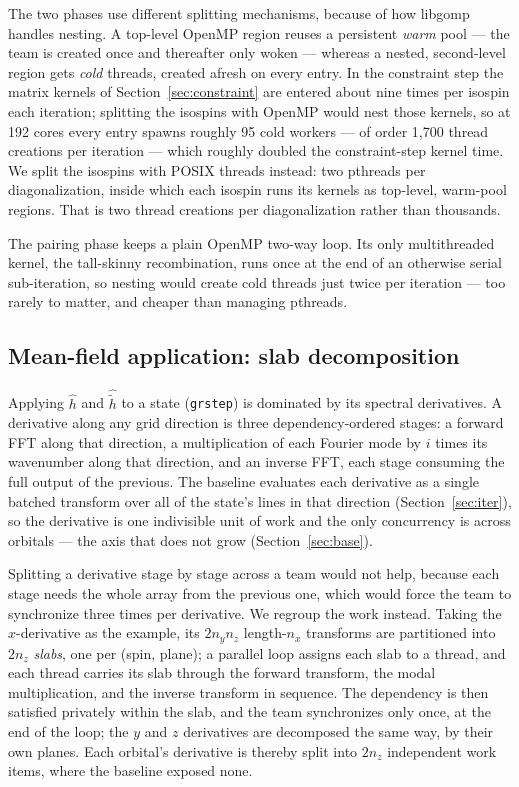 \documentclass[preprint,12pt]{elsarticle}
\numberwithin{equation}{section}
\begin{document}
The two phases use different splitting mechanisms, because of how libgomp handles nesting. A top-level OpenMP region reuses a persistent \emph{warm} pool --- the team is created once and thereafter only woken --- whereas a nested, second-level region gets \emph{cold} threads, created afresh on every entry. In the constraint step the matrix kernels of Section~\ref{sec:constraint} are entered about nine times per isospin each iteration; splitting the isospins with OpenMP would nest those kernels, so at 192 cores every entry spawns roughly 95 cold workers --- of order 1{,}700 thread creations per iteration --- which roughly doubled the constraint-step kernel time. We split the isospins with POSIX threads instead: two pthreads per diagonalization, inside which each isospin runs its kernels as top-level, warm-pool regions. That is two thread creations per diagonalization rather than thousands.

The pairing phase keeps a plain OpenMP two-way loop. Its only multithreaded kernel, the tall-skinny recombination, runs once at the end of an otherwise serial sub-iteration, so nesting would create cold threads just twice per iteration --- too rarely to matter, and cheaper than managing pthreads.

\subsection{Mean-field application: slab decomposition}\label{sec:mf}
Applying $\hat h$ and $\hat{\tilde h}$ to a state (\texttt{grstep}) is dominated by its spectral derivatives. A derivative along any grid direction is three dependency-ordered stages: a forward FFT along that direction, a multiplication of each Fourier mode by $i$ times its wavenumber along that direction, and an inverse FFT, each stage consuming the full output of the previous. The baseline evaluates each derivative as a single batched transform over all of the state's lines in that direction (Section~\ref{sec:iter}), so the derivative is one indivisible unit of work and the only concurrency is across orbitals --- the axis that does not grow (Section~\ref{sec:base}).

Splitting a derivative stage by stage across a team would not help, because each stage needs the whole array from the previous one, which would force the team to synchronize three times per derivative. We regroup the work instead. Taking the $x$-derivative as the example, its $2n_yn_z$ length-$n_x$ transforms are partitioned into $2n_z$ \emph{slabs}, one per (spin, plane); a parallel loop assigns each slab to a thread, and each thread carries its slab through the forward transform, the modal multiplication, and the inverse transform in sequence. The dependency is then satisfied privately within the slab, and the team synchronizes only once, at the end of the loop; the $y$ and $z$ derivatives are decomposed the same way, by their own planes. Each orbital's derivative is thereby split into $2n_z$ independent work items, where the baseline exposed none.
\end{document}
